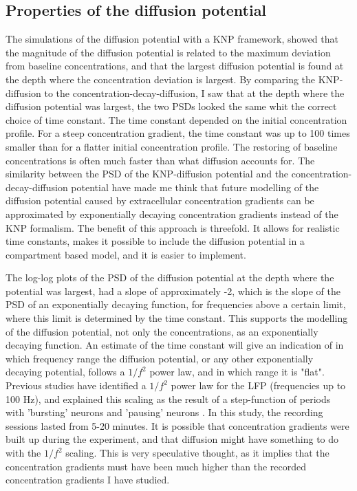 \documentclass{article}
\begin{document}
\subsection{Properties of the diffusion potential}
The simulations of the diffusion potential with a KNP framework, showed that the magnitude of the diffusion potential is related to the maximum deviation from baseline concentrations, and that the largest diffusion potential is found at the depth where the concentration deviation is largest. By comparing the KNP-diffusion to the concentration-decay-diffusion, I saw that at the depth where the diffusion potential was largest, the two PSDs looked the same whit the correct choice of time constant. The time constant depended on the initial concentration profile. For a steep concentration gradient, the time constant was up to 100 times smaller than for a flatter initial concentration profile. The restoring of baseline concentrations is often much faster than what diffusion accounts for. The similarity between the PSD of the KNP-diffusion potential and the concentration-decay-diffusion potential have made me think that future modelling of the diffusion potential caused by extracellular concentration gradients can be approximated by exponentially decaying concentration gradients instead of the KNP formalism. The benefit of this approach is threefold. It allows for realistic time constants, makes it possible to include the diffusion potential in a compartment based model, and it is easier to implement.


The log-log plots of the PSD of the diffusion potential at the depth where the potential was largest, had a slope of approximately -2, which is the slope of the PSD of an exponentially decaying function, for frequencies above a certain limit, where this limit is determined by the time constant. This supports the modelling of the diffusion potential, not only the concentrations, as an exponentially decaying function. An estimate of the time constant will give an indication of in which frequency range the diffusion potential, or any other exponentially decaying potential, follows a $1/f^2$ power law, and in which range it is "flat". Previous studies have identified a  $1/f^2$ power law for the LFP (frequencies up to 100 Hz), and explained this scaling as the result of a step-function of periods with 'bursting' neurons and 'pausing' neurons \cite{Baranuskas2011}. In this study, the recording sessions lasted from 5-20 minutes. It is possible that concentration gradients were built up during the experiment, and that diffusion might have something to do with the $1/f^2$ scaling. This is very speculative thought, as it implies that the concentration gradients must have been much higher than the recorded concentration gradients I have studied. 
\end{document}
